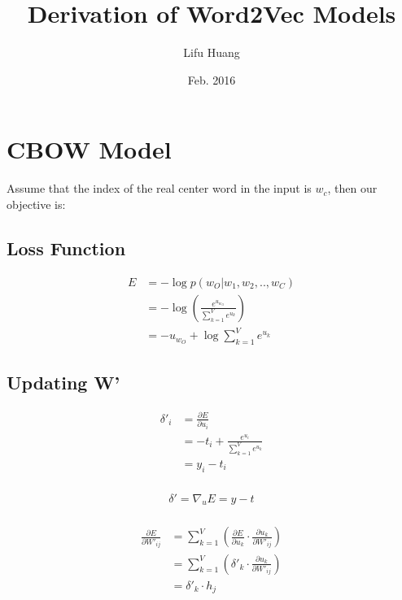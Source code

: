 \documentclass{article}
\title{Derivation of Word2Vec Models}
\author{Lifu Huang}
\date{Feb. 2016}
\begin{document}
	\maketitle
	\section{CBOW Model}
	Assume that the index of the real center word in the input is $w_c$, then our objective is:
	\subsection{Loss Function}
	\begin{equation}
		\begin{aligned}
			E &=-\log  p(w_{O}|w_{1}, w_{2}, .., w_{C})\\ 
			&=-\log  \left( \frac { e^{ u_{w_{O}} } }{ \sum _{ k=1 }^{ V } e^{ u_{ k } } }  \right) \\ 
			&=-u_{w_{O}}+\log { \sum _{ k=1 }^{ V } e^{ u_{ k } } } 
		\end{aligned}
	\end{equation}
	\subsection{Updating W'}
	\begin{equation}
		\begin{aligned}
			\delta'_i &= \frac{\partial E}{\partial u_{i}} \\
			&= -t_i + \frac{e^{u_i}}{\sum_{k=1}^{V}e^{u_{k}}} \\
			&= y_i - t_i \\
		\end{aligned}
	\end{equation}

	\begin{equation}
		\begin{aligned}
			\delta' = \nabla_u E = y - t \\		
		\end{aligned}
	\end{equation}
	
	\begin{equation}
		\begin{aligned}
			\frac{\partial E}{\partial W'_{ij}} &= \sum_{k=1}^{V} \left( \frac{\partial E}{\partial u_k} \cdot \frac{\partial u_k}{\partial W'_{ij}} \right) \\
			&= \sum_{k=1}^{V} \left(\delta'_k \cdot \frac{\partial u_k}{\partial W'_{ij}}\right)  \\
			&= \delta'_k \cdot h_j \\
		\end{aligned}
	\end{equation}	
\end{document}

